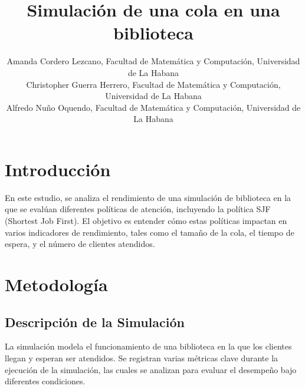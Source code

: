 \documentclass[10pt,twocolumn]{article}
\begin{document}
	\title{Simulación de una cola en una biblioteca}
	\author{
		Amanda Cordero Lezcano, Facultad de Matemática y Computación, Universidad de La Habana\\
		Christopher Guerra Herrero, Facultad de Matemática y Computación, Universidad de La Habana\\
		Alfredo Nuño Oquendo, Facultad de Matemática y Computación, Universidad de La Habana\\
	}
	
	
	
	\section{Introducción}
	En este estudio, se analiza el rendimiento de una simulación de biblioteca en la que se evalúan diferentes políticas de atención, incluyendo la política SJF (Shortest Job First). El objetivo es entender cómo estas políticas impactan en varios indicadores de rendimiento, tales como el tamaño de la cola, el tiempo de espera, y el número de clientes atendidos.
	
	\section{Metodología}
	
	\subsection{Descripción de la Simulación}
	La simulación modela el funcionamiento de una biblioteca en la que los clientes llegan y esperan ser atendidos. Se registran varias métricas clave durante la ejecución de la simulación, las cuales se analizan para evaluar el desempeño bajo diferentes condiciones.
	
\end{document}
